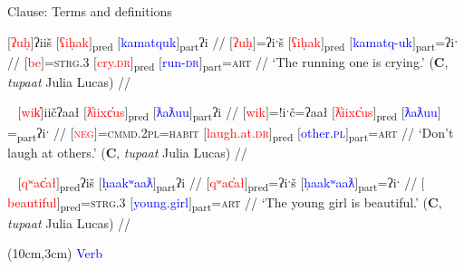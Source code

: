 \begin{frame}{Clause: Terms and definitions}

\ex[exno=6]
\begingl
\glpreamble $[$\textcolor{red}{ʔuḥ}$]$ʔiiš $[$\textcolor{red}{ʕiḥak}$]$\textsubscript{pred} $[$\textcolor{blue}{kamatquk}$]$\textsubscript{part}ʔi //
\gla $[$\textcolor{red}{ʔuḥ}$]$=ʔiˑš $[$\textcolor{red}{ʕiḥak}$]$\textsubscript{pred} $[$\textcolor{blue}{kamatq-uk}$]$\textsubscript{part}=ʔiˑ //
\glb $[$\textcolor{red}{be}$]$=\textsc{strg.3} $[$\textcolor{red}{cry.\textsc{dr}}$]$\textsubscript{pred} $[$\textcolor{blue}{run-\textsc{dr}}$]$\textsubscript{part}=\textsc{art} //
\glft `The running one is crying.' (\textbf{C}, \textit{tupaat} Julia Lucas) //
\endgl \label{ex:verbpart}
\xe

\pause

\ex[exno=7]~ 
\begingl
\glpreamble $[$\textcolor{red}{wik̓}$]$iičʔaał $[$\textcolor{red}{ƛ̓iixc̓us}$]$\textsubscript{pred} $[$\textcolor{blue}{ƛaƛuu}$]$\textsubscript{part}ʔi //
\gla $[$\textcolor{red}{wik}$]$=!iˑč=ʔaał $[$\textcolor{red}{ƛ̓iixc̓us}$]$\textsubscript{pred} $[$\textcolor{blue}{ƛaƛuu}$]$=\textsubscript{part}ʔiˑ //
\glb $[$\textcolor{red}{\textsc{neg}}$]$=\textsc{cmmd.2pl}=\textsc{habit} $[$\textcolor{red}{laugh.at.\textsc{dr}}$]$\textsubscript{pred} $[$\textcolor{blue}{other.\textsc{pl}}$]$\textsubscript{part}=\textsc{art} //
\glft `Don't laugh at others.' (\textbf{C}, \textit{tupaat} Julia Lucas) //
\endgl \label{ex:adjpart}
\xe

\pause

\ex[exno=4]~
\begingl
\glpreamble $[$\textcolor{red}{qʷac̓ał}$]$\textsubscript{pred}ʔiš $[$\textcolor{blue}{ḥaakʷaaƛ}$]$\textsubscript{part}ʔi //
\gla $[$\textcolor{red}{qʷac̓ał}$]$\textsubscript{pred}=ʔiˑš $[$\textcolor{blue}{ḥaakʷaaƛ}$]$\textsubscript{part}=ʔiˑ //
\glb $[$\textcolor{red}{beautiful}$]$\textsubscript{pred}=\textsc{strg.3} $[$\textcolor{blue}{young.girl}$]$\textsubscript{part}=\textsc{art} //
\glft `The young girl is beautiful.' (\textbf{C}, \textit{tupaat} Julia Lucas) //
\endgl \label{ex:nounpart}
\xe

\begin{textblock*}{5cm}(10cm,3cm) %
   \textcolor{blue}{Verb}
\end{textblock*}



\end{frame}

